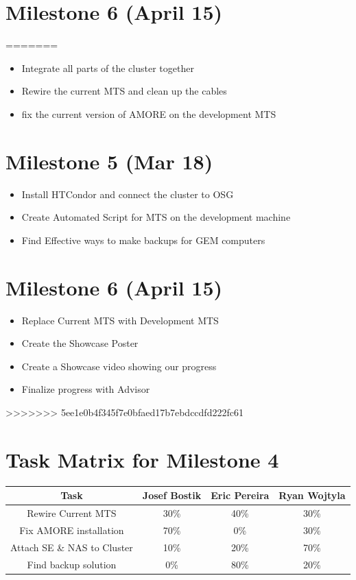 \documentclass[12pt]{article}
\begin{document}
\section{Milestone 6 (April 15)}
=======
\begin{itemize}
	\item Integrate all parts of the cluster together
	\item Rewire the current MTS and clean up the cables 
	\item fix the current version of AMORE on the development MTS
\end{itemize}

\section{Milestone 5 (Mar 18)}
\begin{itemize}
	\item Install HTCondor and connect the cluster to OSG
	\item Create Automated Script for MTS on the development machine
	\item Find Effective ways to make backups for GEM computers
\end{itemize}

\section{Milestone 6 (April 15)}
\begin{itemize}
	\item Replace Current MTS with Development MTS
	\item Create the Showcase Poster
	\item Create a Showcase video showing our progress
	\item Finalize progress with Advisor
\end{itemize}
>>>>>>> 5ee1e0b4f345f7e0bfaed17b7ebdccdfd222fc61

\section{Task Matrix for Milestone 4}
\begin{tabular}{| c | c | c | c |}
	\hline 
	Task & Josef Bostik & Eric Pereira & Ryan Wojtyla \\
	\hline 
	Rewire Current MTS & 30\% & 40\% & 30\% \\
	\hline 
	Fix AMORE installation & 70\% & 0\% & 30\% \\
	\hline
	Attach SE \& NAS to Cluster & 10\% & 20\% & 70\% \\
	\hline
	Find backup solution & 0\% & 80\% & 20\% \\
	\hline
	
\end{tabular}
\end{document}
